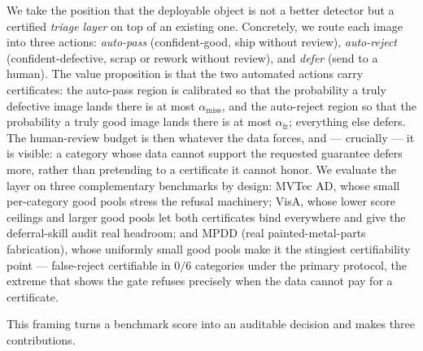 \documentclass[preprint,11pt]{elsarticle}
\begin{document}
We take the position that the deployable object is not a better detector but a certified
\emph{triage layer} on top of an existing one. Concretely, we route each image into three actions:
\emph{auto-pass} (confident-good, ship without review), \emph{auto-reject} (confident-defective,
scrap or rework without review), and \emph{defer} (send to a human). The value proposition is that
the two automated actions carry certificates: the auto-pass region is calibrated so that the
probability a truly defective image lands there is at most $\alpha_{\text{miss}}$, and the
auto-reject region so that the probability a truly good image lands there is at most
$\alpha_{\text{fr}}$; everything else defers. The human-review budget is then whatever the data
forces, and --- crucially --- it is visible: a category whose data cannot support the
requested guarantee defers more, rather than pretending to a certificate it cannot honor.
We evaluate the layer on three complementary benchmarks by design: MVTec AD, whose small
per-category good pools stress the refusal machinery; VisA, whose lower score ceilings and
larger good pools let both certificates bind everywhere and give the deferral-skill audit real
headroom; and MPDD (real painted-metal-parts fabrication), whose uniformly small good pools make
it the stingiest certifiability point --- false-reject certifiable in $0/6$ categories under the
primary protocol, the extreme that shows the gate refuses precisely when the data cannot pay for
a certificate.

This framing turns a benchmark score into an auditable decision and makes three contributions.
\end{document}
